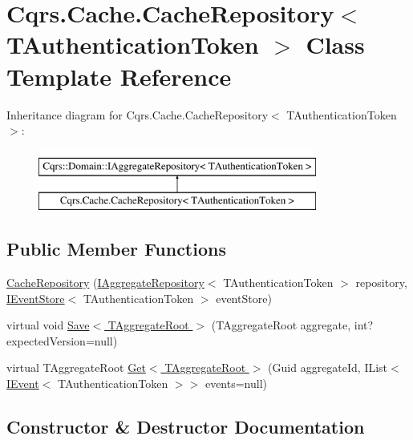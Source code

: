 \hypertarget{classCqrs_1_1Cache_1_1CacheRepository}{}\section{Cqrs.\+Cache.\+Cache\+Repository$<$ T\+Authentication\+Token $>$ Class Template Reference}
\label{classCqrs_1_1Cache_1_1CacheRepository}
Inheritance diagram for Cqrs.\+Cache.\+Cache\+Repository$<$ T\+Authentication\+Token $>$\+:\begin{figure}[H]
\begin{center}
\leavevmode
\includegraphics[height=2.000000cm]{classCqrs_1_1Cache_1_1CacheRepository}
\end{center}
\end{figure}
\subsection*{Public Member Functions}
\begin{DoxyCompactItemize}
\item 
\hyperlink{classCqrs_1_1Cache_1_1CacheRepository_a6c567e999a85f5803a920ce4912833a9}{Cache\+Repository} (\hyperlink{interfaceCqrs_1_1Domain_1_1IAggregateRepository}{I\+Aggregate\+Repository}$<$ T\+Authentication\+Token $>$ repository, \hyperlink{interfaceCqrs_1_1Events_1_1IEventStore}{I\+Event\+Store}$<$ T\+Authentication\+Token $>$ event\+Store)
\item 
virtual void \hyperlink{classCqrs_1_1Cache_1_1CacheRepository_a69df7ee1dc2e4cd38431ab987655eab3}{Save$<$ T\+Aggregate\+Root $>$} (T\+Aggregate\+Root aggregate, int? expected\+Version=null)
\item 
virtual T\+Aggregate\+Root \hyperlink{classCqrs_1_1Cache_1_1CacheRepository_a037acba636aedf23ff376ac0b749ec0c}{Get$<$ T\+Aggregate\+Root $>$} (Guid aggregate\+Id, I\+List$<$ \hyperlink{interfaceCqrs_1_1Events_1_1IEvent}{I\+Event}$<$ T\+Authentication\+Token $>$$>$ events=null)
\end{DoxyCompactItemize}


\subsection{Constructor \& Destructor Documentation}
\mbox{\label{classCqrs_1_1Cache_1_1CacheRepository_a6c567e999a85f5803a920ce4912833a9}} 
